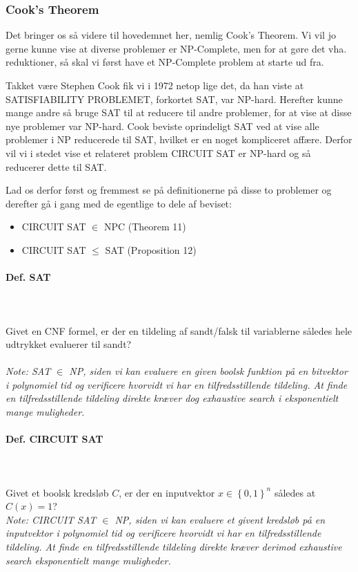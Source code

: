 \subsubsection{Cook's Theorem}

Det bringer os så videre til hovedemnet her, nemlig Cook's Theorem. Vi vil jo
gerne kunne vise at diverse problemer er NP-Complete, men for at gøre det vha.
reduktioner, så skal vi først have et NP-Complete problem at starte ud fra.

Takket være Stephen Cook fik vi i 1972 netop lige det, da han viste at
SATISFIABILITY PROBLEMET, forkortet SAT, var NP-hard. Herefter kunne mange andre
så bruge SAT til at reducere til andre problemer, for at vise at disse nye
problemer var NP-hard. Cook beviste oprindeligt SAT ved at vise alle problemer i
NP reducerede til SAT, hvilket er en noget kompliceret affære. Derfor vil vi i
stedet vise et relateret problem CIRCUIT SAT er NP-hard og så reducerer dette
til SAT.

Lad os derfor først og fremmest se på definitionerne på disse to problemer og
derefter gå i gang med de egentlige to dele af beviset:

\begin{itemize} \item CIRCUIT SAT $\in$ NPC (Theorem 11) \item CIRCUIT SAT
$\leq$ SAT (Proposition 12) \end{itemize}

\paragraph{Def. SAT} ~\\ ~\\ Givet en CNF formel, er der en tildeling af
sandt/falsk til variablerne således hele udtrykket evaluerer til sandt?\\ ~\\
\textit{Note: SAT $\in$ NP, siden vi kan evaluere en given boolsk funktion på
en bitvektor i polynomiel tid og verificere hvorvidt vi har en tilfredsstillende
tildeling. At finde en tilfredsstillende tildeling direkte kræver dog
exhaustive search i eksponentielt mange muligheder.}

\paragraph{Def. CIRCUIT SAT} ~\\ ~\\ Givet et boolsk kredsløb $C$, er der
en inputvektor $x \in \left\lbrace 0,1 \right\rbrace^n$ således at $C(x) =
1$? ~\\ \textit{Note: CIRCUIT SAT $\in$ NP, siden vi kan evaluere et givent
kredsløb på en inputvektor i polynomiel tid og verificere hvorvidt vi har en
tilfredsstillende tildeling. At finde en tilfredsstillende tildeling direkte
kræver derimod exhaustive search eksponentielt mange muligheder.}

